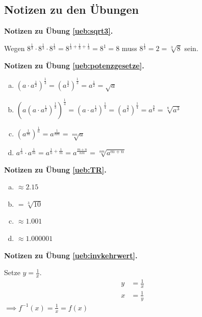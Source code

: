 \documentclass[%
11pt,%
twoside,%
titlepage,%
german,%
headsepline%
]{scrartcl}
\newcommand{\concatueb}[1]{ueb:#1}%
\newcommand{\concatlsg}[1]{lsg:#1}%
\newenvironment{lsg}[1]{%
    \par\noindent\textbf{Notizen zu Übung \ref{\concatueb{#1}}.}%
    \label{\concatlsg{#1}}
}{%
    \par%
}
\begin{document}
\clearpage

\subsection{Notizen zu den \"Ubungen}

\begin{lsg}{sqrt3}
	\hypertarget{lsg:sqrt3}{Wegen $8^{\frac{1}{3}}\cdot8^{\frac{1}{3}}\cdot8^{\frac{1}{3}}=8^{\frac{1}{3}+\frac{1}{3}+\frac{1}{3}}=8^{1}=8$ muss $8^\frac{1}{3}=2=\sqrt[3]{8}$ sein.}
\end{lsg}

\begin{lsg}{potenzgesetze}
    \begin{enumerate}[a)]
      \item $(a\cdot a^\frac{1}{2})^\frac{1}{3}=(a^\frac{3}{2})^\frac{1}{3}=a^\frac{1}{2}=\sqrt{a}$
      \item $(a(a\cdot a^\frac{1}{2})^\frac{1}{3})^\frac{1}{4}=%
      (a\cdot a^\frac{1}{2})^\frac{1}{4}=(a^\frac{3}{2})^\frac{1}{4}=a^\frac{3}{8}=\sqrt[8]{a^3}$
      \item $(a^\frac{1}{m})^\frac{1}{n}=a^\frac{1}{nm}=\sqrt[mn]{a}$
      \item $a^\frac{1}{n}\cdot a^\frac{1}{m}=a^{\frac{1}{n}+\frac{1}{m}}=a^\frac{m+n}{nm}%
      =\sqrt[nm]{a^{m+n}}$
    \end{enumerate}
\end{lsg}

\begin{lsg}{TR}
  \hypertarget{lsg:TR}{}
  \begin{enumerate}[a)]
    \item $\approx2.15$
    \item $=\sqrt[3]{10}$
    \item $\approx1.001$
    \item $\approx1.000001$
  \end{enumerate}
\end{lsg}

\begin{lsg}{invkehrwert}
  Setze $y=\frac{1}{x}$.
  \begin{align*}
    y &= \frac{1}{x}\tag{$\cdot x$, $\div y$}\\
    x &= \frac{1}{y}
  \end{align*}
    $\implies f^{-1}(x)=\frac{1}{x}=f(x)$
\end{lsg}
\end{document}
